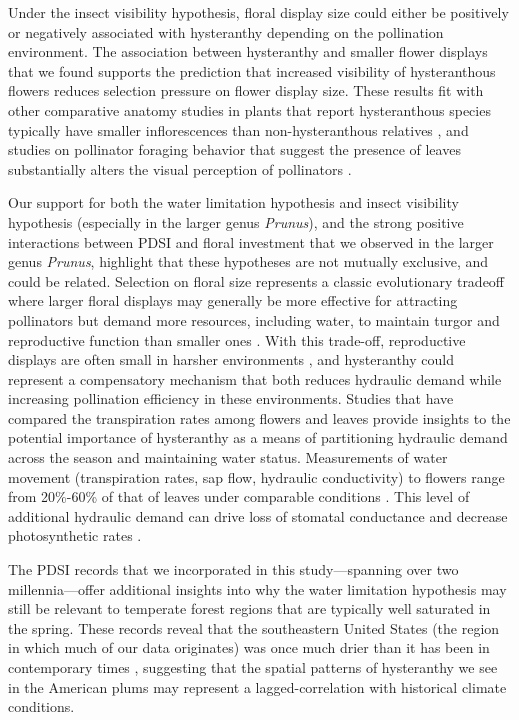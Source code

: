 \documentclass{article}[12pt]
\begin{document}
{{Under the insect visibility hypothesis, floral display size could either be positively or negatively associated with hysteranthy depending on the pollination environment. The association between hysteranthy and smaller flower displays that we found supports the prediction that increased visibility of hysteranthous flowers reduces selection pressure on flower display size. These results fit with other comparative anatomy studies in plants that report hysteranthous species typically have smaller inflorescences than non-hysteranthous relatives \citep{Gunatilleke1984}, and studies on pollinator foraging behavior that suggest the presence of leaves substantially alters the visual perception of pollinators \citep{Rivest:2017aa,Forrest:2009aa}.%

Our support for both the water limitation hypothesis and insect visibility hypothesis (especially in the larger genus \emph{Prunus}), and the strong positive interactions between PDSI and floral investment that we observed in the larger genus \emph{Prunus}, highlight that these hypotheses are not mutually exclusive, and could be related. Selection on floral size represents a classic evolutionary tradeoff where larger floral displays may generally be more effective for attracting pollinators but demand more resources, including water, to maintain turgor and reproductive function than smaller ones \citep{Galen:1999vr,Lambrecht:2007ur}. With this trade-off, reproductive displays are often small in harsher environments \citep{Lambrecht:2013aa,Teixido:2016aa}, and hysteranthy could represent a compensatory mechanism that both reduces hydraulic demand while increasing pollination efficiency in these environments. Studies that have compared the transpiration rates among flowers and leaves provide insights to the potential importance of hysteranthy as a means of partitioning hydraulic demand across the season and maintaining water status. Measurements of water movement (transpiration rates, sap flow, hydraulic conductivity) to flowers range from 20\%-60\% of that of leaves under comparable conditions \citep{Whiley:1988uf,Roddy:2012wn,Liu:2017wg,McMann:2022ww}. This level of additional hydraulic demand can drive loss of stomatal conductance and decrease photosynthetic rates \citep{Galen:1999vr}.
 
The PDSI records  that we incorporated in this study---spanning over two millennia---offer additional insights into why the water limitation hypothesis may still be relevant to temperate forest regions that are typically well saturated in the spring. These records reveal that the southeastern United States (the region in which much of our data originates) was once much drier than it has been in contemporary times \citep[Fig \ref{fig:timeschange}]{Cook_2010}, suggesting that the spatial patterns of hysteranthy we see in the American plums may represent a lagged-correlation with historical climate conditions.

}}
\end{document}
